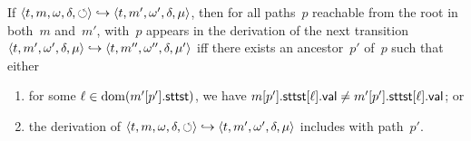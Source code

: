 \begin{thm}\label{thm:eff}
If $\langle t,m,\omega,\delta,\circlearrowleft\rangle \hookrightarrow \langle t,m',\omega',\delta,\mu\rangle$,
then for all paths~$p$ reachable from the root in both~$m$ and~$m'$,
 with~$p$ appears in the derivation of the next transition~$\langle t,m',\omega',\delta,\mu\rangle \hookrightarrow \langle t,m'',\omega'',\delta,\mu'\rangle$
iff there exists an ancestor~$p'$ of~$p$ such that either
\begin{enumerate}
  \item for some $\ell \in \operatorname*{dom}(m'[p'].\textup{\textsf{sttst}})$, we have $m[p'].\textup{\textsf{sttst}}[\ell].\textup{\textsf{val}} \ne m'[p'].\textup{\textsf{sttst}}[\ell].\textup{\textsf{val}}$; or
  \item the derivation of $\langle t,m,\omega,\delta,\circlearrowleft\rangle \hookrightarrow \langle t,m',\omega',\delta,\mu\rangle$ includes  with path~$p'$.
\end{enumerate}
\end{thm}

